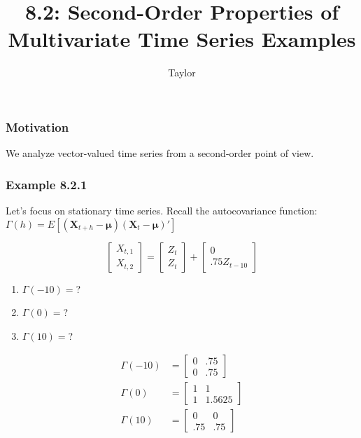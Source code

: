 \documentclass{beamer}
\title["8.2"]{8.2: Second-Order Properties of Multivariate Time Series Examples}
\author{Taylor}
\institute[UVA] 
{
University of Virginia \\
\medskip
\textit{} 
}
\date{}
\begin{document}

\begin{frame}
\titlepage 
\end{frame}

\begin{frame}
\frametitle{Motivation}

We analyze vector-valued time series from a second-order point of view.

\end{frame}


\begin{frame}
\frametitle{Example 8.2.1}

Let's focus on stationary time series.  Recall the autocovariance function: $\Gamma(h) = E[(\mathbf{X}_{t+h} - \bm{\mu})(\mathbf{X}_t - \bm{\mu})']$ 

\[
\left[\begin{array}{c}
X_{t,1} \\
X_{t,2}
\end{array}\right]
=
\left[\begin{array}{c}
Z_{t} \\
Z_{t}
\end{array}\right]
+
\left[\begin{array}{c}
0 \\
.75 Z_{t-10}
\end{array}\right]
\]

\begin{enumerate}
\item $\Gamma(-10)=$?
\item $\Gamma(0)=$?
\item $\Gamma(10)=$?
\end{enumerate}
\pause

\begin{align*}
\Gamma(-10) &= 
\left[\begin{array}{cc}
0 & .75 \\
0 & .75
\end{array}\right]\\
\Gamma(0) &= 
\left[\begin{array}{cc}
1 & 1 \\
1 & 1.5625
\end{array}\right] \\
\Gamma(10) &= 
\left[\begin{array}{cc}
0 & 0 \\
.75 & .75
\end{array}\right]
\end{align*}


\end{frame}
\end{document}
